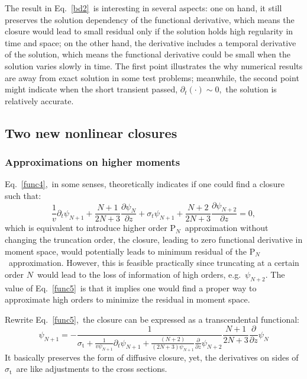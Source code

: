 \documentclass[review]{elsarticle}
\newcommand{\st}{\sigma_\mathrm{t}}
\newcommand{\pn}{P$_N$}
\newcommand{\ppz}{\frac{\partial}{\partial z}}
\newcommand{\psii}[1]{\psi_\ensuremath{{#1}}}
\begin{document}
The result in Eq.~\eqref{bd2}~is interesting in several aspects: one on hand, it still preserves the solution dependency of the functional derivative, which means the closure would lead to small residual only if the solution holds high regularity in time and space; on the other hand, the derivative includes a temporal derivative of the solution, which means the functional derivative could be small when the solution varies slowly in time. The first point illustrates the why numerical results are away from exact solution in some test problems; meanwhile, the second point might indicate when the short transient passed, $\partial_t(\cdot)\sim 0$,~the solution is relatively accurate.
\subsection{Two new nonlinear closures}
\subsubsection{Approximations on higher moments}
Eq.~\eqref{func4},~in some senses, theoretically indicates if one could find a closure such that:
\begin{equation}\label{func5}
\frac{1}{v}\partial_t\psi_{N+1}+\frac{N+1}{2N+3}\frac{\partial\psi_{N}}{\partial z}
+\sigma_{t}\psi_{N+1}+\frac{N+2}{2N+3}\frac{\partial\psi_{N+2}}{\partial z}=0,
\end{equation}
which is equivalent to introduce higher order \pn~approximation without changing the truncation order, the closure, leading to zero functional derivative in moment space, would potentially leads to minimum residual of the \pn~approximation. However, this is feasible practically since truncating at a certain order $N$~would lead to the loss of information of high orders, e.g.~$\psii{N+2}$. The value of Eq.~\eqref{func5}~is that it implies one would find a proper way to approximate high orders to minimize the residual in moment space.

Rewrite Eq.~\eqref{func5},~the closure can be expressed as a transcendental functional:
\begin{equation}\label{oricl}
\psii{N+1}=-\frac{1}{\sigma_\mathrm{t}+\displaystyle\frac{1}{v\psii{N+1}}\partial_t\psii{N+1}+\frac{(N+2)}{(2N+3)\psii{N+1}}\ppz\psii{N+2}}\frac{N+1}{2N+3}\ppz\psii{N}
\end{equation}
It basically preserves the form of diffusive closure, yet, the derivatives on sides of $\st$~are like adjustments to the cross sections.
\end{document}
